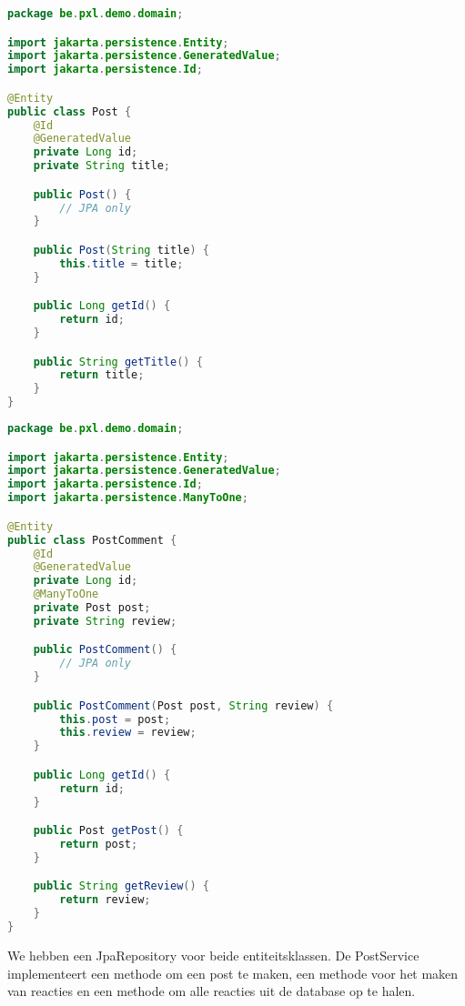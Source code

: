 \begin{lstlisting}[frame=single,  language=java]
package be.pxl.demo.domain;

import jakarta.persistence.Entity;
import jakarta.persistence.GeneratedValue;
import jakarta.persistence.Id;

@Entity
public class Post {
	@Id
	@GeneratedValue
	private Long id;
	private String title;

	public Post() {
		// JPA only
	}

	public Post(String title) {
		this.title = title;
	}

	public Long getId() {
		return id;
	}

	public String getTitle() {
		return title;
	}
}
\end{lstlisting}

\begin{lstlisting}[frame=single,  language=java]
package be.pxl.demo.domain;

import jakarta.persistence.Entity;
import jakarta.persistence.GeneratedValue;
import jakarta.persistence.Id;
import jakarta.persistence.ManyToOne;

@Entity
public class PostComment {
	@Id
	@GeneratedValue
	private Long id;
	@ManyToOne
	private Post post;
	private String review;

	public PostComment() {
		// JPA only
	}

	public PostComment(Post post, String review) {
		this.post = post;
		this.review = review;
	}

	public Long getId() {
		return id;
	}

	public Post getPost() {
		return post;
	}

	public String getReview() {
		return review;
	}
}
\end{lstlisting}

We hebben een JpaRepository voor beide entiteitsklassen.
De PostService implementeert een methode om een post te maken, een methode voor het maken van reacties en een methode om alle reacties uit de database op te halen.


